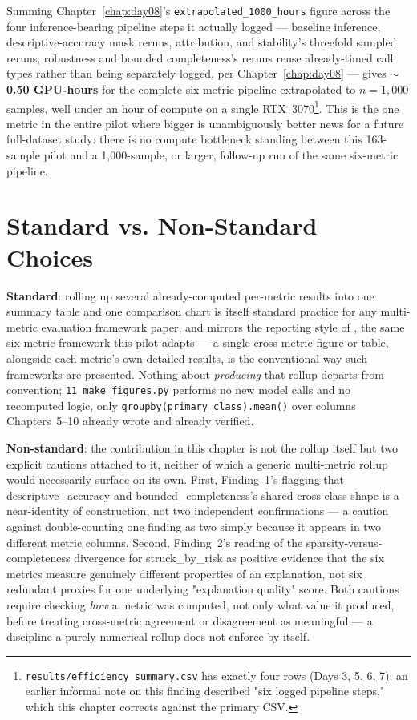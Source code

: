 Summing Chapter~\ref{chap:day08}'s \texttt{extrapolated\_1000\_hours} figure across the four
inference-bearing pipeline steps it actually logged --- baseline inference, descriptive-accuracy
mask reruns, attribution, and stability's threefold sampled reruns; robustness and bounded
completeness's reruns reuse already-timed call types rather than being separately logged, per
Chapter~\ref{chap:day08} --- gives \textbf{$\sim$0.50 GPU-hours} for the complete six-metric
pipeline extrapolated to $n=1{,}000$ samples, well under an hour of compute on a
single RTX~3070\footnote{\texttt{results/efficiency\_summary.csv} has exactly four rows (Days 3, 5, 6, 7); an earlier informal note on this finding described "six logged pipeline steps," which this chapter corrects against the primary CSV.}. This is the one metric in the entire pilot where bigger is unambiguously
better news for a future full-dataset study: there is no compute bottleneck standing between
this 163-sample pilot and a 1{,}000-sample, or larger, follow-up run of the same six-metric
pipeline.

\section{Standard vs. Non-Standard Choices}

\textbf{Standard}: rolling up several already-computed per-metric results into one summary
table and one comparison chart is itself standard practice for any multi-metric evaluation
framework paper, and mirrors the reporting style of \citep{arreche2024exai}, the same
six-metric framework this pilot adapts --- a single cross-metric figure or table, alongside
each metric's own detailed results, is the conventional way such frameworks are presented.
Nothing about \emph{producing} that rollup departs from convention; \texttt{11\_make\_figures.py}
performs no new model calls and no recomputed logic, only \texttt{groupby(primary\_class).mean()}
over columns Chapters~5--10 already wrote and already verified.

\textbf{Non-standard}: the contribution in this chapter is not the rollup itself but two
explicit cautions attached to it, neither of which a generic multi-metric rollup would
necessarily surface on its own. First, Finding~1's flagging that descriptive\_accuracy and
bounded\_completeness's shared cross-class shape is a near-identity of construction, not two
independent confirmations --- a caution against double-counting one finding as two simply
because it appears in two different metric columns. Second, Finding~2's reading of the
sparsity-versus-completeness divergence for struck\_by\_risk as positive evidence that the six
metrics measure genuinely different properties of an explanation, not six redundant proxies for
one underlying "explanation quality" score. Both cautions require checking \emph{how} a metric
was computed, not only what value it produced, before treating cross-metric agreement or
disagreement as meaningful --- a discipline a purely numerical rollup does not enforce by
itself.

